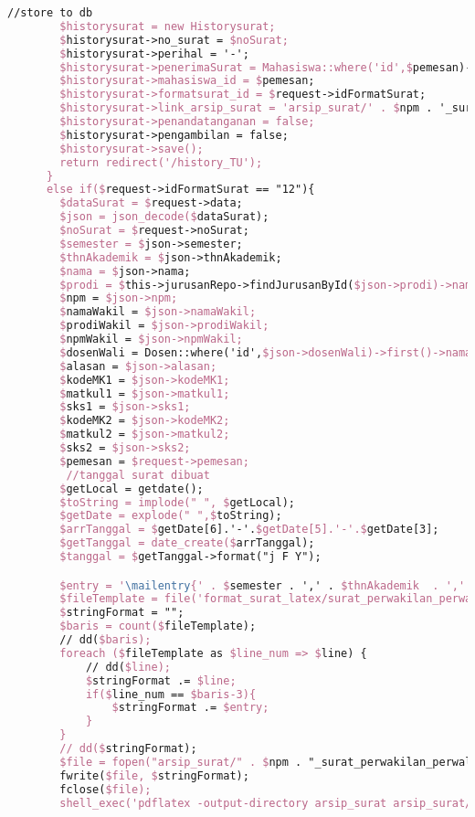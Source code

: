 \begin{lstlisting}[language=tex,basicstyle=\tiny,caption=HistorysuratController.php]
        //store to db
        $historysurat = new Historysurat;
        $historysurat->no_surat = $noSurat;
        $historysurat->perihal = '-';
        $historysurat->penerimaSurat = Mahasiswa::where('id',$pemesan)->first()->dosen->nama_dosen;
        $historysurat->mahasiswa_id = $pemesan;
        $historysurat->formatsurat_id = $request->idFormatSurat;
        $historysurat->link_arsip_surat = 'arsip_surat/' . $npm . '_surat_perwakilan_perwalian_1mk.pdf';
        $historysurat->penandatanganan = false;
        $historysurat->pengambilan = false;
        $historysurat->save();
        return redirect('/history_TU');
      }
      else if($request->idFormatSurat == "12"){
        $dataSurat = $request->data;
        $json = json_decode($dataSurat);
        $noSurat = $request->noSurat;
        $semester = $json->semester;
        $thnAkademik = $json->thnAkademik;
        $nama = $json->nama;
        $prodi = $this->jurusanRepo->findJurusanById($json->prodi)->nama_jurusan;
        $npm = $json->npm;
        $namaWakil = $json->namaWakil;
        $prodiWakil = $json->prodiWakil;
        $npmWakil = $json->npmWakil;
        $dosenWali = Dosen::where('id',$json->dosenWali)->first()->nama_dosen;
        $alasan = $json->alasan;
        $kodeMK1 = $json->kodeMK1;
        $matkul1 = $json->matkul1;
        $sks1 = $json->sks1;
        $kodeMK2 = $json->kodeMK2;
        $matkul2 = $json->matkul2;
        $sks2 = $json->sks2;
        $pemesan = $request->pemesan;
         //tanggal surat dibuat
        $getLocal = getdate();
        $toString = implode(" ", $getLocal);
        $getDate = explode(" ",$toString);
        $arrTanggal = $getDate[6].'-'.$getDate[5].'-'.$getDate[3];
        $getTanggal = date_create($arrTanggal);
        $tanggal = $getTanggal->format("j F Y");

        $entry = '\mailentry{' . $semester . ',' . $thnAkademik  . ',' . $nama . ',' . $prodi . ',' . $npm . ',' . $namaWakil . ',' . $prodiWakil . ',' . $npmWakil . ',' . $dosenWali . ',' . $alasan . ',' . $kodeMK1 . ',' . $matkul1 . ',' . $sks1 . ',' . $kodeMK2 . ',' . $matkul2 . ',' . $sks2 . ',' . $tanggal . '}';
        $fileTemplate = file('format_surat_latex/surat_perwakilan_perwalian_2mk.tex');
        $stringFormat = "";
        $baris = count($fileTemplate);
        // dd($baris);
        foreach ($fileTemplate as $line_num => $line) {
            // dd($line);
            $stringFormat .= $line;
            if($line_num == $baris-3){
                $stringFormat .= $entry;
            }
        }
        // dd($stringFormat);
        $file = fopen("arsip_surat/" . $npm . "_surat_perwakilan_perwalian_2mk.tex", "w");
        fwrite($file, $stringFormat);
        fclose($file);
        shell_exec('pdflatex -output-directory arsip_surat arsip_surat/' . $npm . '_surat_perwakilan_perwalian_2mk.tex');


\end{lstlisting}
